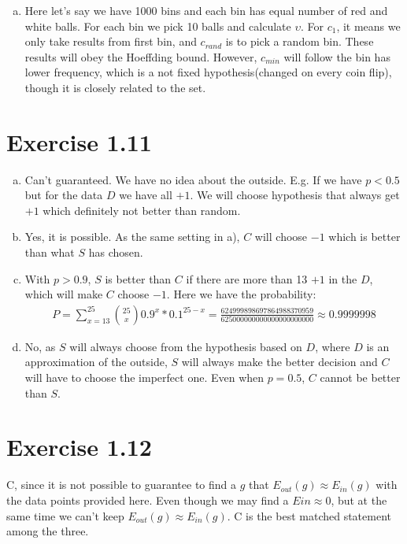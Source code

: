 \documentclass{article}
\def\math#1{$#1$}
\begin{document}
\begin{enumerate}[a)]
    \item Here let's say we have 1000 bins and each bin has equal number of red and white balls. For each bin we pick 10 balls and calculate \math{\upsilon}. For \math{c_1}, it means we only take results from first bin, and \math{c_{rand}} is to pick a random bin. These results will obey the Hoeffding bound. However, \math{c_{min}} will follow the bin has lower frequency, which is a not fixed hypothesis(changed on every coin flip), though it is closely related to the set.
\end{enumerate}

\section{Exercise 1.11}
\begin{enumerate}[a)]
    \item Can't guaranteed. We have no idea about the outside. E.g. If we have \math{p < 0.5} but for the data \math{D} we have all \math{+1}. We will choose hypothesis that always get \math{+1} which definitely not better than random.
    \item Yes, it is possible. As the same setting in a), \math{C} will choose \math{-1} which is better than what \math{S} has chosen.
    \item With \math{p > 0.9}, \math{S} is better than \math{C} if there are more than 13 \math{+1} in the \math{D}, which will make \math{C} choose \math{-1}. Here we have the probability: 
    \begin{equation}
        \begin{split}
            P = \sum^{25}_{x = 13}{25 \choose x}0.9^x * 0.1^{25 - x} = \frac{624999898697864988370959}{625000000000000000000000} \approx 0.9999998
        \end{split}
    \end{equation}
    \item No, as \math{S} will always choose from the hypothesis based on \math{D}, where \math{D} is an approximation of the outside, \math{S} will always make the better decision and \math{C} will have to choose the imperfect one. Even when \math{p = 0.5}, \math{C} cannot be better than \math{S}.
\end{enumerate}

\section{Exercise 1.12}

C, since it is not possible to guarantee to find a \math{g} that \math{E_{out}(g) \approx E_{in}(g)} with the data points provided here. Even though we may find a \math{E{in} \approx 0}, but at the same time we can't keep \math{E_{out}(g) \approx E_{in}(g)}. C is the best matched statement among the three.
\end{document}

